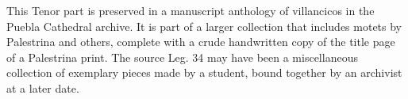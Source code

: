 \begin{notesources}
    \begin{source}
    \end{source}
\end{notesources}

This Tenor part is preserved in a manuscript anthology of villancicos in the
Puebla Cathedral archive.
It is part of a larger collection that includes motets by Palestrina and
others, complete with a crude handwritten copy of the title page of a
Palestrina print.
The source Leg. 34 may have been a miscellaneous collection of exemplary
pieces made by a student, bound together by an archivist at a later date.

\endinput
